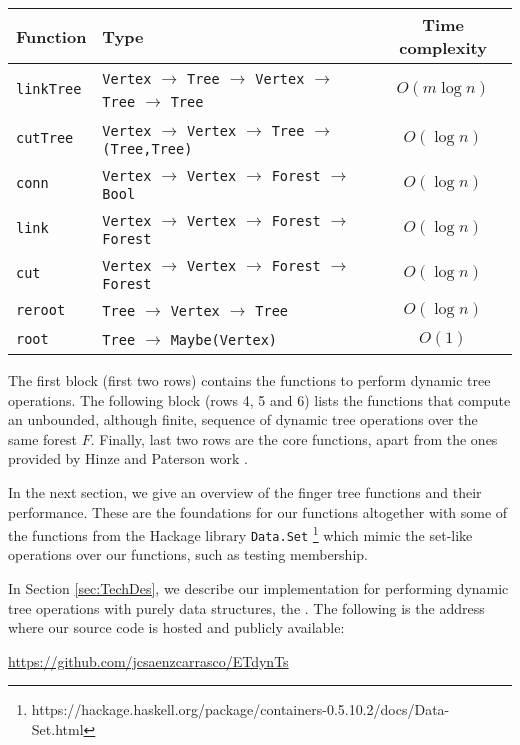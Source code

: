 \begin{center}
\small
 \begin{tabular}{||l | l | c||} 
 \hline
 Function & Type & Time complexity \\ %
 \hline\hline
 \texttt{linkTree} & \texttt{Vertex} $\to$ \texttt{Tree} $\to$ \texttt{Vertex} $\to$ \texttt{Tree} $\to$ \texttt{Tree} & $O(m\log n)$ \\
 \texttt{cutTree} & \texttt{Vertex} $\to$ \texttt{Vertex} $\to$ \texttt{Tree} $\to$ \texttt{(Tree,Tree)} & $O(\log n)$ \\
 \hline
 \texttt{conn} & \texttt{Vertex} $\to$ \texttt{Vertex} $\to$ \texttt{Forest} $\to$ \texttt{Bool} & $O(\log n)$ \\ 
 \texttt{link} & \texttt{Vertex} $\to$ \texttt{Vertex} $\to$ \texttt{Forest} $\to$ \texttt{Forest} & $O(\log n)$ \\
 \texttt{cut} & \texttt{Vertex} $\to$ \texttt{Vertex} $\to$ \texttt{Forest} $\to$ \texttt{Forest} & $O(\log n)$ \\
 \hline
 \texttt{reroot} & \texttt{Tree} $\to$ \texttt{Vertex} $\to$ \texttt{Tree} & $O(\log n)$ \\
 \texttt{root} & \texttt{Tree} $\to$ \texttt{Maybe(Vertex)} & $O(1)$ \\
 \hline   
\end{tabular}
\end{center}
\normalsize 

The first block (first two rows) contains the functions to perform dynamic tree operations. The following block (rows 4, 5 and 6) lists the functions that compute an unbounded, although finite, sequence of dynamic tree operations over the same forest $F$. Finally, last two rows are the core functions, apart from the ones provided by Hinze and Paterson work \cite{FTs}. 

In the next section, we give an overview of the finger tree functions and their performance. These are the foundations for our functions altogether with some of the functions from the Hackage library \texttt{Data.Set} \footnote{https://hackage.haskell.org/package/containers-0.5.10.2/docs/Data-Set.html} which mimic the set-like operations over our functions, such as testing membership. 

In Section \ref{sec:TechDes}, we describe our implementation for performing dynamic tree operations with purely data structures, the \dyntset. The following is the address where our source code is hosted and publicly available:
\begin{center}
\url{https://github.com/jcsaenzcarrasco/ETdynTs}
\end{center}

